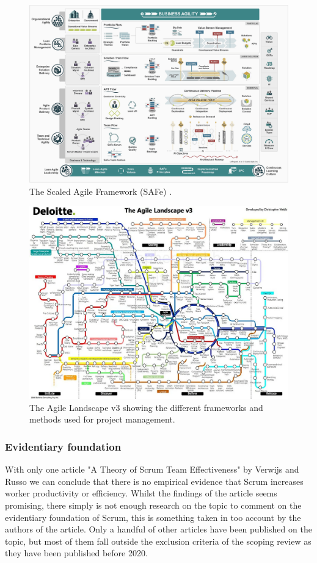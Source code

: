 \documentclass[12pt]{article}
\begin{document}
\begin{figure}
  \centering
  \includegraphics[width=\textwidth]{sAFE.png}
  \caption{The Scaled Agile Framework (SAFe) \cite{Framework}.}
  \label{fig:sAFE}
\end{figure}

\begin{figure}
  \centering
  \includegraphics[width=\textwidth]{the_agile_landscape.png}
  \caption{The Agile Landscape v3 \cite{DeloitteAuditConsulting} showing the different frameworks and methods used for project management.}
  \label{fig:the_agile_landscape}
\end{figure}

\newpage

\subsubsection{Evidentiary foundation}
With only one article "A Theory of Scrum Team Effectiveness" by Verwijs and Russo \cite{verwijsTheoryScrumTeam2023} we can conclude that there
is no empirical evidence that Scrum increases worker productivity or efficiency. Whilst the findings of the article seems promising, there simply is not 
enough research on the topic to comment on the evidentiary foundation of Scrum, this is something taken in too account by the authors of the article. 
Only a handful of other articles have been published on the topic, but most of them fall outside the exclusion criteria of the scoping review as they
have been published before 2020.
\end{document}
